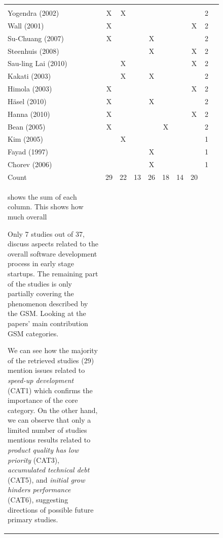 \documentclass[12pt,journal,compsoc]{../sty/IEEEtran}
\begin{document}
\begin{table}[!t]
\begin{figure}[!t]
\begin{compactitem}
\begin{table}[!t]
\begin{tabular}{|l||c||c||c||c||c||c||c||c||c|}
\cite{Deakins2005} \\ Yogendra (2002) & X & X &  &  &  &  &  & 2 &
\cite{Yogendra2002} \\ Wall (2001) & X &  &  &  &  &  & X & 2 & \cite{Wall2001}
\\ Su-Chuang (2007) & X &  &  & X &  &  &  & 2 & \cite{Su-Chan2007} \\ Steenhuis
(2008) &  &  &  & X &  &  & X & 2 & \cite{Steenhuis2008} \\ Sau-ling Lai (2010)
&  & X &  &  &  &  & X & 2 & \cite{Lai2010} \\ Kakati (2003) &  & X &  & X &  &
&  & 2 & \cite{Kakati2003} \\ Himola (2003) & X &  &  &  &  &  & X & 2 &
\cite{Hilmola2003} \\ H\"{a}sel (2010) & X &  &  & X &  &  &  & 2 &
\cite{Hasel2010} \\ Hanna (2010) & X &  &  &  &  &  & X  & 2 & \cite{Hanna2010}
\\ Bean (2005) & X &  &  &  & X &  &  & 2 & \cite{Bean2005} \\ Kim (2005) &  & X
&  &  &  &  &  & 1 & \cite{Kim2005} \\ Fayad (1997) &  &  &  & X &  &  &  & 1 &
\cite{Fayad1997} \\ Chorev (2006) &  &  &  & X &  &  &  & 1 & \cite{Chorev2006}
\\ \hline Count & 29 & 22 & 13 & 26 & 18 & 14 & 20 & &\\ %
shows the sum of each column. This shows how much  %
overall %

Only 7 studies out of 37, discuss aspects related to the overall software
development process in early stage startups. The remaining part of the studies
is only partially covering the phenomenon described by the GSM. Looking at the
papers' main contribution%
GSM categories.

We can see how the majority of the retrieved studies (29) mention issues
related to \textit{speed-up development} (CAT1) which confirms the importance of
the core category. On the other hand, we can observe that only a limited number
of studies mentions results related to \textit{product quality has low priority}
(CAT3), \textit{accumulated technical debt} (CAT5), and \textit{initial grow
hinders performance} (CAT6), suggesting directions of possible future primary
studies.


\end{tabular}
\end{table}
\end{compactitem}
\end{figure}
\end{table}
\end{document}
